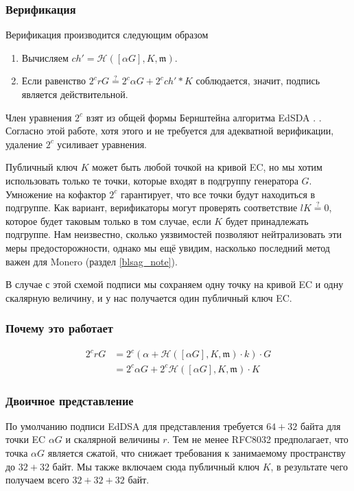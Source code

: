 \subsubsection*{Верификация}
Верификация производится следующим образом

\begin{enumerate}
	\item Вычисляем \(ch' = \mathcal{H}([\alpha G], K,  \mathfrak{m})\).
	
	\item Если равенство \(2^c r G \stackrel{?}{=} 2^c \alpha G + 2^c ch'*K \) соблюдается, значит, подпись является действи\-тельной.
\end{enumerate}

Член уравнения $2^c$ взят из общей формы Бернштейна алгоритма EdSDA \cite{Bernstein2012}. . Согласно этой работе, хотя этого и не требуется для адекватной верификации, удаление $2^c$ усиливает уравнения.

Публичный ключ $K$ может быть любой точкой на кривой EC, но мы хотим использовать только те точки, которые входят в подгруппу генератора $G$. Умножение на кофактор $2^c$ гарантирует, что все точки будут находиться в подгруппе. Как вариант, верификаторы могут проверять соответствие $l K \stackrel{?}{=} 0$, которое будет таковым только в том случае, если $K$ будет принадлежать подгруппе. Нам неизвестно, сколько уязвимостей позволяют нейтрализовать эти меры предосторожности, однако мы ещё увидим, насколько последний метод важен для Monero (раздел \ref{blsag_note}).

В случае с этой схемой подписи мы сохраняем одну точку на кривой EC и одну скалярную величину, и у нас получается один публичный ключ EC.

\subsubsection*{Почему это работает}
\begin{align*}
2^c r G &= 2^c (\alpha + \mathcal{H}([\alpha G], K,  \mathfrak{m}) \cdot k) \cdot G \\
		&= 2^c \alpha G + 2^c \mathcal{H}([\alpha G], K,  \mathfrak{m}) \cdot K 
\end{align*}

\subsubsection*{Двоичное представление}

По умолчанию подписи EdDSA для представления требуется \(64 + 32\) байта для точки EC $\alpha G$ и скалярной величины $r$. Тем не менее RFC8032 предполагает, что точка \(\alpha G\) является сжатой, что снижает требования к занимаемому пространству до \(32 + 32\) байт. Мы также включаем сюда публичный ключ $K$, в результате чего получаем всего \(32 + 32 + 32\) байт.



